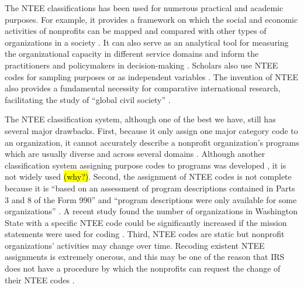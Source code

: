 \documentclass[11pt]{article}
\begin{document}
The NTEE classifications has been used for numerous practical and academic purposes. For example, it provides a framework on which the social and economic activities of nonprofits can be mapped and compared with other types of organizations in a society \parencite[e.g.,][]{RoegerNonprofitSectorIts2015}. It can also serve as an analytical tool for measuring the organizational capacity in different service domains and inform the practitioners and policymakers in decision-making \parencite{Hodgkinsonnewresearchplanning1991}. Scholars also use NTEE codes for sampling purposes \parencite[e.g.,][]{OktenDeterminantsdonationsprivate2000,CarmanEvaluationCapacityNonprofit2010} or as independent variables \parencite{SloanEffectsNonprofitAccountability2009}. The invention of NTEE also provides a fundamental necessity for comparative international research, facilitating the study of ``global civil society'' \parencite{VakilConfrontingclassificationproblem1997,Salamonsearchnonprofitsector1992,Salamoninternationalclassificationnonprofit1996,HodgkinsonMappingnonprofitsector1990}.

The NTEE classification system, although one of the best we have, still has several major drawbacks. First, because it only assign one major category code to an organization, it cannot accurately describe a nonprofit organization's programs which are usually diverse and across several domains \parencite[303]{GronbjergUsingNTEEclassify1994}. Although another classification system assigning purpose codes to programs was developed \parencite{LampkinIntroducingNonprofitProgram2001}, it is not widely used \hl{(why?)}. Second, the assignment of NTEE codes is not complete because it is ``based on an assessment of program descriptions contained in Parts 3 and 8 of the Form 990'' and ``program descriptions were only available for some organizations'' \parencite[16]{NationalCenterforCharitableStatisticsGuideUsingNCCS2006}. A recent study found the number of organizations in Washington State with a specific NTEE code could be significantly increased if the mission statements were used for coding \parencite{FyallNTEECodesOpportunities2018}. Third, NTEE codes are static but nonprofit organizations' activities may change over time. Recoding existent NTEE assignments is extremely onerous, and this may be one of the reason that IRS does not have a procedure by which the nonprofits can request the change of their NTEE codes \parencite{USInternalRevenueServiceIRSStaticFiles2013}.
\end{document}
